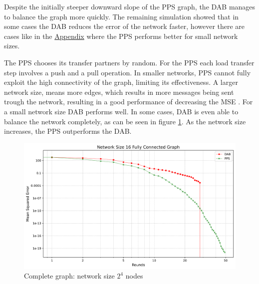 Despite the initially steeper downward slope of the PPS graph, the DAB manages to balance the graph more quickly. The remaining simulation showed that in some cases the DAB reduces the error of the network faster, however there are cases like in the \hyperref[chap:appendix]{Appendix} where the PPS performs better for small network sizes.

The PPS chooses its transfer partners by random. For the PPS each load transfer step involves a push and a pull operation. In smaller networks, PPS cannot fully exploit the high connectivity of the graph, limiting its effectiveness. A larger network size, means more edges, which results in more messages being sent trough the network, resulting in a good performance of decreasing the MSE \cite{nugroho2023PushPullSumDataAg}. For a small network size DAB performs well. In some cases, DAB is even able to balance the network completely, as can be seen in figure \ref{fig:16CompleteGraph}. As the network size increases, the PPS outperforms the DAB.\\
\begin{figure}[H]
    \centering
    \includegraphics[scale=0.5]{figures/completeGraphSimulations/DAB_vs_PPS_FCG_r50_n16.png}
    \caption{Complete graph: network size $2^{4}$ nodes}
    \label{fig:16CompleteGraph}
\end{figure}

